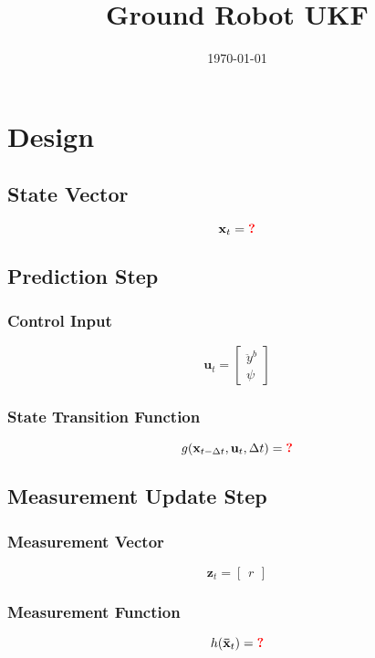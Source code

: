 \documentclass{article}
\title{Ground Robot UKF}
\author{\todo{Student name here}}
\date{\today}
\newcommand{\todo}[1]{\textcolor{red}{\textbf{#1}}}
\begin{document}
\maketitle

\section{Design}

\subsection{State Vector}

\begin{equation}
  \mathbf{x}_t=\todo{?}
\end{equation}

\subsection{Prediction Step}

\subsubsection{Control Input}

\begin{equation}
  \mathbf{u}_t = \begin{bmatrix}
  \ddot y^b \\
  \psi
  \end{bmatrix}
\end{equation}

\subsubsection{State Transition Function}

\begin{equation}
  g(\mathbf{x}_{t-\Delta t}, \mathbf{u}_t, \Delta t) = \todo{?}
\end{equation}

\subsection{Measurement Update Step}

\subsubsection{Measurement Vector}

\begin{equation}
  \mathbf{z}_t = \begin{bmatrix}
  r
  \end{bmatrix}
\end{equation}

\subsubsection{Measurement Function}

\begin{equation}
  h(\mathbf{\bar x}_t) = \todo{?}
\end{equation}
\end{document}
